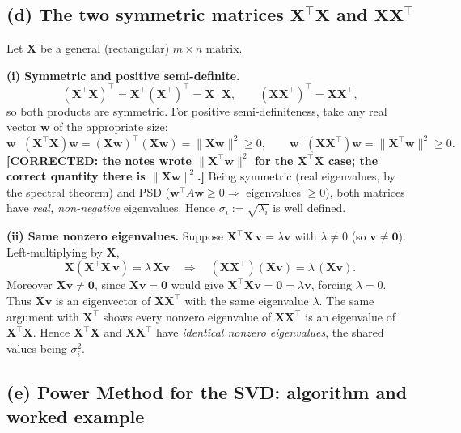 \documentclass[12pt,a4paper]{article}
\newcommand{\fix}[1]{{\textbf{\textcolor{orange!85!black}{[CORRECTED: #1]}}}}
\theoremstyle{definition}
\newcommand{\Xb}{\mathbf{X}}
\newcommand{\vv}{\mathbf{v}}
\newcommand{\zero}{\mathbf{0}}
\newcommand{\norm}[1]{\lVert #1 \rVert}
\newcommand{\T}{^{\!\top}}
\begin{document}
\subsection{(d) The two symmetric matrices $\Xb\T\Xb$ and $\Xb\Xb\T$}

Let $\Xb$ be a general (rectangular) $m\times n$ matrix.

\textbf{(i) Symmetric and positive semi-definite.}
\[
(\Xb\T\Xb)\T=\Xb\T(\Xb\T)\T=\Xb\T\Xb,\qquad
(\Xb\Xb\T)\T=\Xb\Xb\T,
\]
so both products are symmetric. For positive semi-definiteness, take any real
vector $\mathbf w$ of the appropriate size:
\[
\mathbf w\T(\Xb\T\Xb)\mathbf w=(\Xb\mathbf w)\T(\Xb\mathbf w)=\norm{\Xb\mathbf w}^2\ge0,
\qquad
\mathbf w\T(\Xb\Xb\T)\mathbf w=\norm{\Xb\T\mathbf w}^2\ge0 .
\]
\fix{the notes wrote $\norm{\Xb\T\mathbf w}^2$ for the $\Xb\T\Xb$ case; the correct
quantity there is $\norm{\Xb\mathbf w}^2$.} Being symmetric (real eigenvalues, by
the spectral theorem) and PSD ($\mathbf w\T A\mathbf w\ge0\Rightarrow$ eigenvalues
$\ge0$), both matrices have \emph{real, non-negative} eigenvalues. Hence
$\sigma_i:=\sqrt{\lambda_i}$ is well defined.

\textbf{(ii) Same nonzero eigenvalues.}
Suppose $\Xb\T\Xb\,\vv=\lambda\vv$ with $\lambda\ne0$ (so $\vv\ne\zero$).
Left-multiplying by $\Xb$,
\[
\Xb(\Xb\T\Xb\,\vv)=\lambda\,\Xb\vv
\quad\Longrightarrow\quad
(\Xb\Xb\T)(\Xb\vv)=\lambda\,(\Xb\vv).
\]
Moreover $\Xb\vv\ne\zero$, since $\Xb\vv=\zero$ would give
$\Xb\T\Xb\vv=\zero=\lambda\vv$, forcing $\lambda=0$. Thus $\Xb\vv$ is an
eigenvector of $\Xb\Xb\T$ with the same eigenvalue $\lambda$. The same argument
with $\Xb\T$ shows every nonzero eigenvalue of $\Xb\Xb\T$ is an eigenvalue of
$\Xb\T\Xb$. Hence $\Xb\T\Xb$ and $\Xb\Xb\T$ have \emph{identical nonzero
eigenvalues}, the shared values being $\sigma_i^{2}$.

\subsection{(e) Power Method for the SVD: algorithm and worked example}
\end{document}
